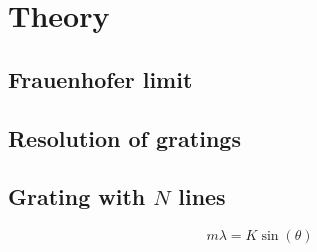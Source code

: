 \section{Theory}
\subsection{Frauenhofer limit}
\label{sec:Frauenhofer} %

\subsection{Resolution of gratings}
\label{sec:resolution}

\subsection{Grating with $N$ lines}
\begin{equation}
    m \lambda = K \sin(\theta)
    \label{eq:N_lines_interference}
\end{equation}
